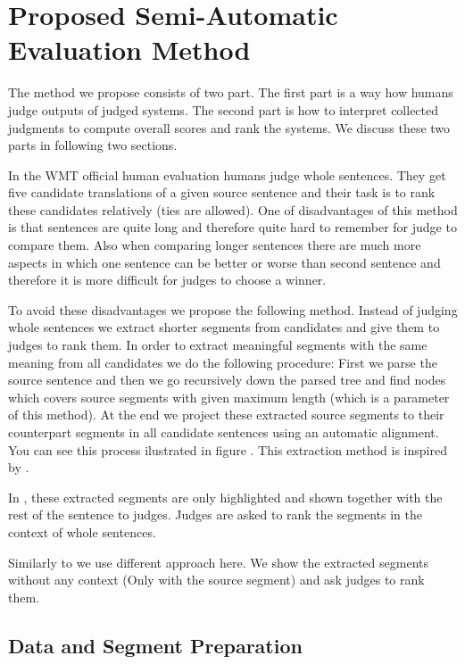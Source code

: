 \chapter{Proposed Semi-Automatic Evaluation Method}

The method we propose consists of two part. The first part is a way how humans
judge outputs of judged systems. The second part is how to interpret collected
judgments to compute overall scores and rank the systems. We discuss these two
parts in following two sections.

In the WMT official human evaluation humans judge whole sentences. They get
five candidate translations of a given source sentence and their task is to
rank these candidates relatively (ties are allowed). One of disadvantages of
this method is that sentences are quite long and therefore quite hard to
remember for judge to compare them. Also when comparing longer sentences there
are much more aspects in which one sentence can be better or worse than second
sentence and therefore it is more difficult for judges to choose a winner. 

To avoid these disadvantages we propose the following method. Instead of
judging whole sentences we extract shorter segments from candidates and give
them to judges to rank them. In order to extract meaningful segments with the
same meaning from all candidates we do the following procedure: First we parse
the source sentence and then we go recursively down the parsed tree and find
nodes which covers source segments with given maximum length (which is a
parameter of this method). At the end we project these extracted source
segments to their counterpart segments in all candidate sentences using an
automatic alignment.  You can see this process ilustrated in figure
. This extraction method is inspired by .

In , these extracted segments are only highlighted and shown
together with the rest of the sentence to judges. Judges are asked to rank the
segments in the context of whole sentences.

Similarly to  we use different approach here. We show
the extracted segments without any context (Only with the source segment) and
ask judges to rank them. 




\section{Data and Segment Preparation}

